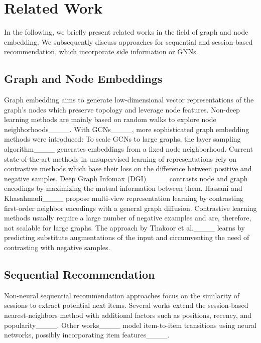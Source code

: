 \section{Related Work}
In the following, we briefly present related works in the field of graph and node embedding. We subsequently discuss approaches for sequential and session-based recommendation, which incorporate side information or GNNs.


\subsection{Graph and Node Embeddings}
Graph embedding aims to generate low-dimensional vector representations of the graph's nodes which preserve topology and leverage node features. Non-deep learning methods are mainly based on random walks to explore node neighborhoods____. With GCNs____, more sophisticated graph embedding methods were introduced: To scale GCNs to large graphs, the layer sampling algorithm____ generates embeddings from a fixed node neighborhood. Current state-of-the-art methods in unsupervised learning of representations rely on contrastive methods which base their loss on the difference between positive and negative samples. Deep Graph Infomax (DGI)____ contrasts node and graph encodings by maximizing the mutual information between them. Hassani and Khasahmadi____ propose multi-view representation learning by contrasting first-order neighbor encodings with a general graph diffusion. %
Contrastive learning methods usually require a large number of negative examples and are, therefore, not scalable for large graphs. The approach by Thakoor et al.____ learns by predicting substitute augmentations of the input and circumventing the need of contrasting with negative samples.

\subsection{Sequential Recommendation}
Non-neural sequential recommendation approaches focus on the similarity of sessions to extract potential next items. Several works extend the session-based nearest-neighbors method with additional factors such as positions, recency, and popularity____. Other works____ model item-to-item transitions using neural networks, possibly incorporating item features____.


